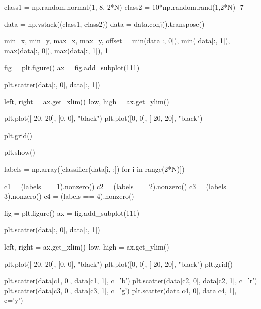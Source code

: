 class1 = np.random.normal(1, 8, 2*N)
class2 = 10*np.random.rand(1,2*N) -7

data = np.vstack((class1, class2))
data = data.conj().transpose()



min_x, min_y, max_x, max_y, offset = min(data[:, 0]), min(
    data[:, 1]), max(data[:, 0]), max(data[:, 1]), 1

fig = plt.figure()
ax = fig.add_subplot(111)

plt.scatter(data[:, 0], data[:, 1])

left, right = ax.get_xlim()
low, high = ax.get_ylim()


plt.plot([-20, 20], [0, 0], "black")
plt.plot([0, 0], [-20, 20], "black")

plt.grid()

plt.show()

labels = np.array([classifier(data[i, :]) for i in range(2*N)])

c1 = (labels == 1).nonzero()
c2 = (labels == 2).nonzero()
c3 = (labels == 3).nonzero()
c4 = (labels == 4).nonzero()

fig = plt.figure()
ax = fig.add_subplot(111)

plt.scatter(data[:, 0], data[:, 1])

left, right = ax.get_xlim()
low, high = ax.get_ylim()

plt.plot([-20, 20], [0, 0], "black")
plt.plot([0, 0], [-20, 20], "black")
plt.grid()

plt.scatter(data[c1, 0], data[c1, 1], c='b')
plt.scatter(data[c2, 0], data[c2, 1], c='r')
plt.scatter(data[c3, 0], data[c3, 1], c='g')
plt.scatter(data[c4, 0], data[c4, 1], c='y')